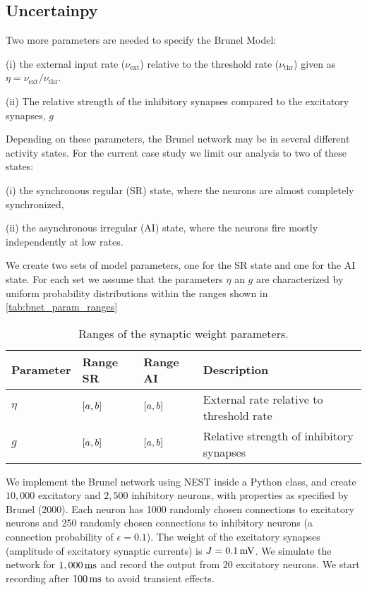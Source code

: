 \subsection{Uncertainpy}

Two more parameters are needed to specify the Brunel Model: 

(i) the external input rate ($\nu_\mathrm{ext}$) relative to the threshold rate ($\nu_\mathrm{thr}$) given as $\eta = \nu_\mathrm{ext} / \nu_\mathrm{thr}$. 

(ii) The relative strength of the inhibitory synapses compared to the excitatory synapses, $g$ 


Depending on these parameters, the Brunel network may be in several different activity states. For the current case study we limit our analysis to two of these states:

(i) the synchronous regular (SR) state, where the neurons are almost completely synchronized, 

(ii) the asynchronous irregular (AI) state, where the neurons fire mostly independently at low rates. 

We create two sets of model parameters, one for the SR state and one for the AI state. For each set we assume that the parameters $\eta$ an $g$ are characterized by uniform probability distributions within the ranges shown in \autoref{tab:bnet_param_ranges}

\begin{table}[!htb]
  \caption{Ranges of the synaptic weight parameters.}
  \begin{center}
    \begin{tabular}{llll}
      \toprule
      \textbf{Parameter} & \textbf{Range SR} & \textbf{Range AI} & \textbf{Description} 
      \\
      \midrule
      $\eta$ & $\qty[a, b]$ & $\qty[a, b]$ & External rate relative to threshold rate
      \\
      $g$ & $\qty[a, b]$ & $\qty[a, b]$ & Relative strength of inhibitory synapses
      \\
      \bottomrule
    \end{tabular}
  \end{center}
  \label{tab:bnet_param_ranges}
\end{table}

We implement the Brunel network using NEST inside a Python class, and create $10,000$ excitatory and $2,500$ inhibitory neurons, with properties as specified by Brunel (2000). Each neuron has 1000 randomly chosen connections to excitatory neurons and 250 randomly chosen connections to inhibitory neurons (a connection probability of $\epsilon=0.1$). The weight of the excitatory synapses (amplitude of excitatory synaptic currents) is $J=0.1 \,\mathrm{mV}$. We simulate the network for $1,000 \,\mathrm{ms}$ and record the output from $20$ excitatory neurons. We start recording after $100 \,\mathrm{ms}$ to avoid transient effects. 

